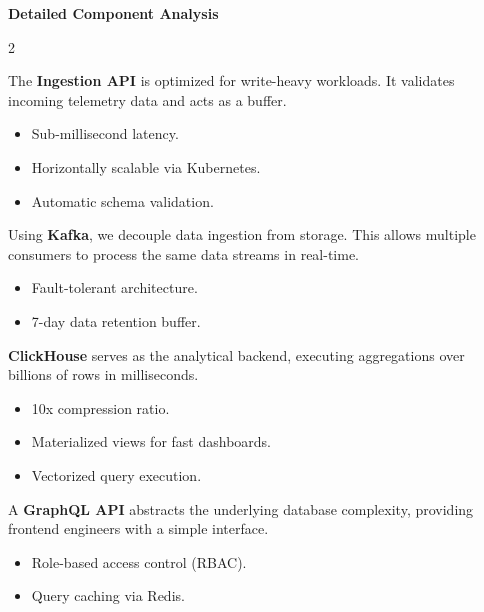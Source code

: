 \documentclass[11pt, a4paper]{article}
\begin{document}
\vspace{0.8cm}

\noindent\textcolor{primary}{\Large\bfseries Detailed Component Analysis}
\vspace{0.3cm}

\begin{multicols}{2}

\begin{tcolorbox}[featurebox={1. High-Throughput Ingestion}]
    The \textbf{Ingestion API} is optimized for write-heavy workloads. It validates incoming telemetry data and acts as a buffer.
    \begin{itemize}[leftmargin=*]
        \item Sub-millisecond latency.
        \item Horizontally scalable via Kubernetes.
        \item Automatic schema validation.
    \end{itemize}
\end{tcolorbox}

\begin{tcolorbox}[featurebox={2. Distributed Stream Processing}]
    Using \textbf{Kafka}, we decouple data ingestion from storage. This allows multiple consumers to process the same data streams in real-time.
    \begin{itemize}[leftmargin=*]
        \item Fault-tolerant architecture.
        \item 7-day data retention buffer.
    \end{itemize}
\end{tcolorbox}

\columnbreak

\begin{tcolorbox}[featurebox={3. Columnar Data Lake}]
    \textbf{ClickHouse} serves as the analytical backend, executing aggregations over billions of rows in milliseconds.
    \begin{itemize}[leftmargin=*]
        \item 10x compression ratio.
        \item Materialized views for fast dashboards.
        \item Vectorized query execution.
    \end{itemize}
\end{tcolorbox}

\begin{tcolorbox}[featurebox={4. Unified Query Layer}]
    A \textbf{GraphQL API} abstracts the underlying database complexity, providing frontend engineers with a simple interface.
    \begin{itemize}[leftmargin=*]
        \item Role-based access control (RBAC).
        \item Query caching via Redis.
    \end{itemize}
\end{tcolorbox}

\end{multicols}
\end{document}
